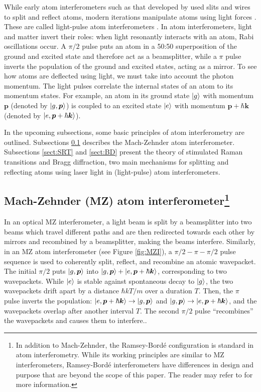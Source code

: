\documentclass[reprint,
nofootinbib,
amsmath,amssymb,
aps]{revtex4-1}
\begin{document}
While early atom interferometers such as that developed by \cite{keith1991interferometer} used slits and wires to split and reflect atoms, modern iterations manipulate atoms using light forces \cite{rasel1995atom}. These are called light-pulse atom interferometers \cite{kasevich1992measurement}. In atom interferometers, light and matter invert their roles: when light resonantly interacts with an atom, Rabi oscillations occur. A $\pi/2$ pulse puts an atom in a 50:50 superposition of the ground and excited state and therefore act as a beamsplitter, while a $\pi$ pulse inverts the population of the ground and excited states, acting as a mirror.  To see how atoms are deflected using light, we must take into account the photon momentum. The light pulses correlate the internal states of an atom to its momentum states. For example, an atom in its ground state $\ket{g}$ with momentum $\bm{p}$ (denoted by $\ket{g,\bm{p}}$) is coupled to an excited state $\ket{e}$ with momentum $\bm{p} + \hbar \bm{k}$ (denoted by $\ket{e,\bm{p} + \hbar\bm{k}}$).  



In the upcoming subsections, some basic principles of atom interferometry are outlined. Subsections \ref{sect:MZI} describes the Mach-Zehnder atom interferometer. Subsections \ref{sect:SRT} and \ref{sect:BD} present the theory of stimulated Raman transitions and Bragg diffraction, two main mechanisms for splitting and reflecting atoms using laser light in (light-pulse) atom interferometers.  





\subsection{Mach-Zehnder (MZ) atom interferometer\footnote{In addition to Mach-Zehnder, the Ramsey-Bord\'{e} configuration is standard in atom interferometry. While its working principles are similar to MZ interferometers, Ramsey-Bord\'{e} interferometers have differences in design and purpose that are beyond the scope of this paper. The reader may refer to \cite{mueller2014quantum} for more information.  }}\label{sect:MZI}

In an optical MZ interferometer,  a light beam is split by a beamsplitter into two beams which travel different paths and are then redirected towards each other by mirrors and recombined by a beamsplitter, making the beams interfere. Similarly, in an MZ atom interferometer (see Figure \ref{fig:MZI}), a $\pi/2-\pi-\pi/2$ pulse sequence is used to coherently split, reflect, and recombine an atomic wavepacket. The initial $\pi/2$ puts $\ket{g,\bm{p}}$ into $\ket{g,\bm{p}} + \ket{e,\bm{p} + \hbar \bm{k}}$, corresponding to two wavepackets. While $\ket{e}$ is stable against spontaneous decay to $\ket{g}$, the two wavepackets drift apart by a distance $\hbar kT /m$ over a duration $T$. Then, the $\pi$ pulse inverts the population: $\ket{e,\bm{p} + \hbar \bm{k}} \to \ket{g, \bm{p}}$ and $\ket{g,\bm{p}} \to \ket{e,\bm{p} + \hbar \bm{k}}$, and the wavepackets overlap after another interval $T$. The second $\pi/2$ pulse ``recombines'' the wavepackets and causes them to interfere.\cite{kasevich1992measurement}.
\end{document}
